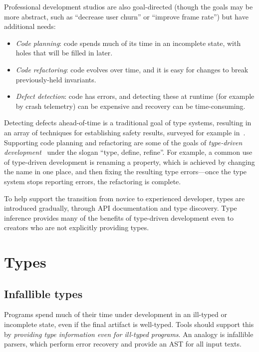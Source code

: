 \documentclass[acmsmall]{acmart}
\begin{document}
Professional development studios are also goal-directed (though the
goals may be more abstract, such as ``decrease user churn'' or
``improve frame rate'') but have additional needs:
\begin{itemize}

\item \emph{Code planning}:
  code spends much of its time in an incomplete state, with holes
  that will be filled in later.

\item \emph{Code refactoring}:
  code evolves over time, and it is easy for changes to
  break previously-held invariants.

\item \emph{Defect detection}:
  code has errors, and detecting these at runtime (for example by crash telemetry)
  can be expensive and recovery can be time-consuming.
  
\end{itemize}
Detecting defects ahead-of-time is a traditional goal of type systems,
resulting in an array of techniques for establishing safety results,
surveyed for example in~\cite{TAPL}. Supporting code planning and
refactoring are some of the goals of \emph{type-driven
development}~\cite{TDDIdris} under the slogan ``type, define,
refine''.  For example, a common use of type-driven development is renaming a
property, which is achieved by changing the name in one place,
and then fixing the resulting type errors---once the type system stops
reporting errors, the refactoring is complete.

To help support the transition from novice to experienced developer,
types are introduced gradually, through API documentation and type discovery.
Type inference provides many of the benefits of type-driven development
even to creators who are not explicitly providing types.

\section{Types}
\subsection{Infallible types}

Programs spend much of their time under development in an ill-typed or incomplete state, even if the
final artifact is well-typed. Tools should support this by \emph{providing type information even for ill-typed programs}.
An analogy is infallible parsers, which perform error recovery and provide an AST for all input texts.
\end{document}
